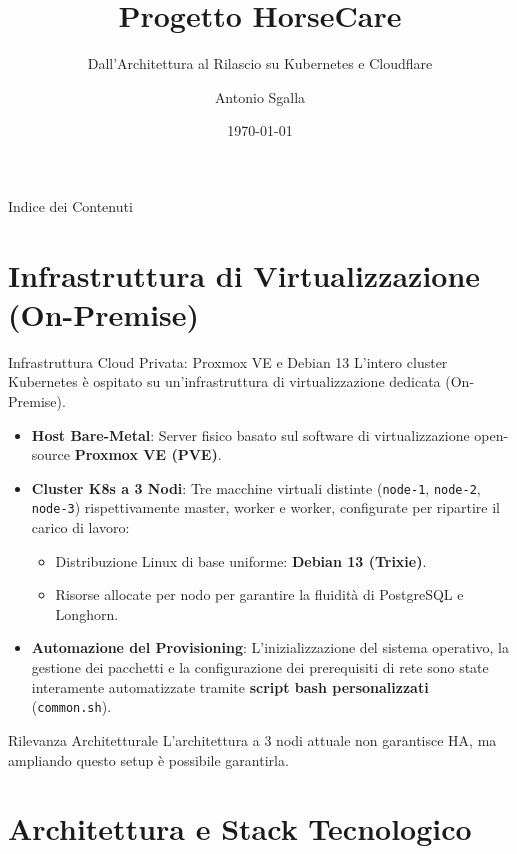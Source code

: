 \documentclass[aspectratio=169]{beamer}
\title[HorseCare]{Progetto HorseCare}
\subtitle{Dall'Architettura al Rilascio su Kubernetes e Cloudflare}
\author{Antonio Sgalla}
\institute{Università degli Studi di Camerino}
\date{\today}
\begin{document}
\begin{frame}
    \titlepage
\end{frame}

\begin{frame}{Indice dei Contenuti}
    \tableofcontents
\end{frame}

\section{Infrastruttura di Virtualizzazione (On-Premise)}

\begin{frame}{Infrastruttura Cloud Privata: Proxmox VE e Debian 13}
    L'intero cluster Kubernetes è ospitato su un'infrastruttura di virtualizzazione dedicata (On-Premise).
    \begin{itemize}
        \item \textbf{Host Bare-Metal}: Server fisico basato sul software di virtualizzazione open-source \textbf{Proxmox VE (PVE)}.
        \item \textbf{Cluster K8s a 3 Nodi}: Tre macchine virtuali distinte (\texttt{node-1}, \texttt{node-2}, \texttt{node-3}) rispettivamente master, worker e worker, configurate per ripartire il carico di lavoro:
            \begin{itemize}
                \item Distribuzione Linux di base uniforme: \textbf{Debian 13 (Trixie)}.
                \item Risorse allocate per nodo per garantire la fluidità di PostgreSQL e Longhorn.
            \end{itemize}
        \item \textbf{Automazione del Provisioning}: L'inizializzazione del sistema operativo, la gestione dei pacchetti e la configurazione dei prerequisiti di rete sono state interamente automatizzate tramite \textbf{script bash personalizzati} (\texttt{common.sh}).
    \end{itemize}
    \begin{block}{Rilevanza Architetturale}
        L'architettura a 3 nodi attuale non garantisce HA, ma ampliando questo setup è possibile garantirla.
    \end{block}
\end{frame}

\section{Architettura e Stack Tecnologico}
\end{document}
